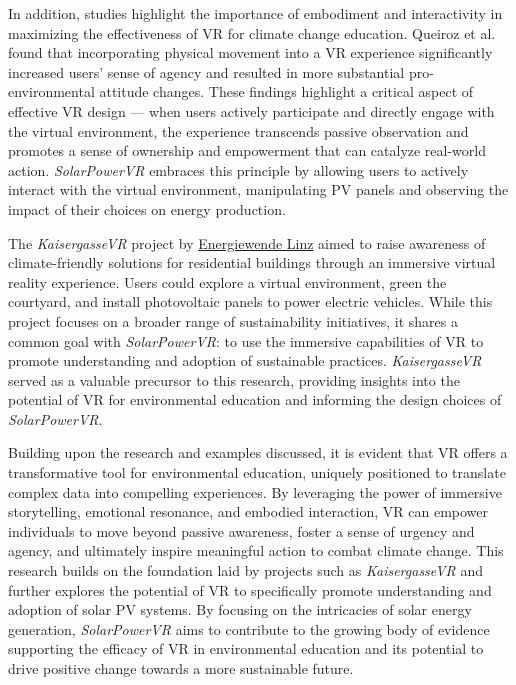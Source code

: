 \documentclass[draft, final]{vutinfth} %
\begin{document}
In addition, studies highlight the importance of embodiment and interactivity in maximizing the effectiveness of VR for climate change education. Queiroz et al. \cite{Queiroz2023Efficacy} found that incorporating physical movement into a VR experience significantly increased users' sense of agency and resulted in more substantial pro-environmental attitude changes. These findings highlight a critical aspect of effective VR design — when users actively participate and directly engage with the virtual environment, the experience transcends passive observation and promotes a sense of ownership and empowerment that can catalyze real-world action. \textit{SolarPowerVR} embraces this principle by allowing users to actively interact with the virtual environment, manipulating PV panels and observing the impact of their choices on energy production.

The \textit{KaisergasseVR} project by \href{https://www.energiewende-linz.at}{Energiewende Linz} aimed to raise awareness of climate-friendly solutions for residential buildings through an immersive virtual reality experience. Users could explore a virtual environment, green the courtyard, and install photovoltaic panels to power electric vehicles. While this project focuses on a broader range of sustainability initiatives, it shares a common goal with \textit{SolarPowerVR}: to use the immersive capabilities of VR to promote understanding and adoption of sustainable practices. \textit{KaisergasseVR} served as a valuable precursor to this research, providing insights into the potential of VR for environmental education and informing the design choices of \textit{SolarPowerVR}.

Building upon the research and examples discussed, it is evident that VR offers a transformative tool for environmental education, uniquely positioned to translate complex data into compelling experiences. By leveraging the power of immersive storytelling, emotional resonance, and embodied interaction, VR can empower individuals to move beyond passive awareness, foster a sense of urgency and agency, and ultimately inspire meaningful action to combat climate change. This research builds on the foundation laid by projects such as \textit{KaisergasseVR} and further explores the potential of VR to specifically promote understanding and adoption of solar PV systems. By focusing on the intricacies of solar energy generation, \textit{SolarPowerVR} aims to contribute to the growing body of evidence supporting the efficacy of VR in environmental education and its potential to drive positive change towards a more sustainable future.
\end{document}
